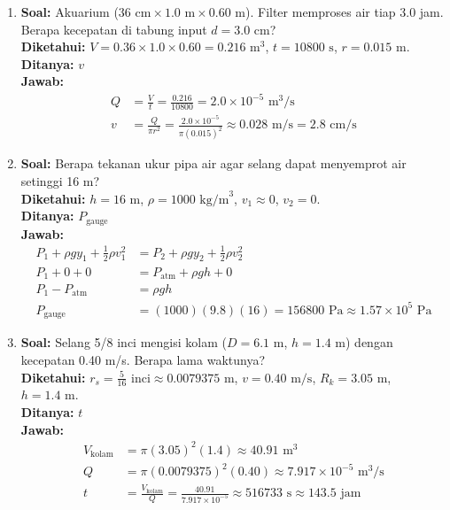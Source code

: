 \documentclass[twocolumn]{article}
\begin{document}
\begin{enumerate}
    \item \textbf{Soal:} Akuarium ($36 \text{ cm} \times 1.0 \text{ m} \times 0.60 \text{ m}$). Filter memproses air tiap 3.0 jam. Berapa kecepatan di tabung input $d = 3.0 \text{ cm}$? \\
    \textbf{Diketahui:} $V = 0.36 \times 1.0 \times 0.60 = 0.216 \text{ m}^3$, $t = 10800 \text{ s}$, $r = 0.015 \text{ m}$. \\
    \textbf{Ditanya:} $v$ \\
    \textbf{Jawab:}
    \begin{align*}
        Q &= \frac{V}{t} = \frac{0.216}{10800} = 2.0 \times 10^{-5} \text{ m}^3/\text{s} \\
        v &= \frac{Q}{\pi r^2} = \frac{2.0 \times 10^{-5}}{\pi (0.015)^2} \approx 0.028 \text{ m/s} = 2.8 \text{ cm/s}
    \end{align*}

    \item \textbf{Soal:} Berapa tekanan ukur pipa air agar selang dapat menyemprot air setinggi 16 m? \\
    \textbf{Diketahui:} $h = 16 \text{ m}$, $\rho = 1000 \text{ kg/m}^3$, $v_1 \approx 0$, $v_2 = 0$. \\
    \textbf{Ditanya:} $P_{\text{gauge}}$ \\
    \textbf{Jawab:}
    \begin{align*}
        P_1 + \rho g y_1 + \frac{1}{2}\rho v_1^2 &= P_2 + \rho g y_2 + \frac{1}{2}\rho v_2^2 \\
        P_1 + 0 + 0 &= P_{\text{atm}} + \rho g h + 0 \\
        P_1 - P_{\text{atm}} &= \rho g h \\
        P_{\text{gauge}} &= (1000)(9.8)(16) = 156800 \text{ Pa} \approx 1.57 \times 10^5 \text{ Pa}
    \end{align*}

    \item \textbf{Soal:} Selang 5/8 inci mengisi kolam ($D = 6.1 \text{ m}$, $h = 1.4 \text{ m}$) dengan kecepatan 0.40 m/s. Berapa lama waktunya? \\
    \textbf{Diketahui:} $r_s = \frac{5}{16} \text{ inci} \approx 0.0079375 \text{ m}$, $v = 0.40 \text{ m/s}$, $R_k = 3.05 \text{ m}$, $h = 1.4 \text{ m}$. \\
    \textbf{Ditanya:} $t$ \\
    \textbf{Jawab:}
    \begin{align*}
        V_{\text{kolam}} &= \pi (3.05)^2 (1.4) \approx 40.91 \text{ m}^3 \\
        Q &= \pi (0.0079375)^2 (0.40) \approx 7.917 \times 10^{-5} \text{ m}^3/\text{s} \\
        t &= \frac{V_{\text{kolam}}}{Q} = \frac{40.91}{7.917 \times 10^{-5}} \approx 516733 \text{ s} \approx 143.5 \text{ jam}
    \end{align*}


\end{enumerate}
\end{document}
